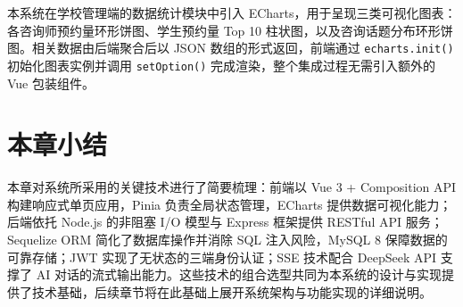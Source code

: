 本系统在学校管理端的数据统计模块中引入 ECharts，用于呈现三类可视化图表：各咨询师预约量环形饼图、学生预约量 Top 10 柱状图，以及咨询话题分布环形饼图。相关数据由后端聚合后以 JSON 数组的形式返回，前端通过 \texttt{echarts.init()} 初始化图表实例并调用 \texttt{setOption()} 完成渲染，整个集成过程无需引入额外的 Vue 包装组件。

\section*{本章小结}

本章对系统所采用的关键技术进行了简要梳理：前端以 Vue 3 + Composition API 构建响应式单页应用，Pinia 负责全局状态管理，ECharts 提供数据可视化能力；后端依托 Node.js 的非阻塞 I/O 模型与 Express 框架提供 RESTful API 服务；Sequelize ORM 简化了数据库操作并消除 SQL 注入风险，MySQL 8 保障数据的可靠存储；JWT 实现了无状态的三端身份认证；SSE 技术配合 DeepSeek API 支撑了 AI 对话的流式输出能力。这些技术的组合选型共同为本系统的设计与实现提供了技术基础，后续章节将在此基础上展开系统架构与功能实现的详细说明。
